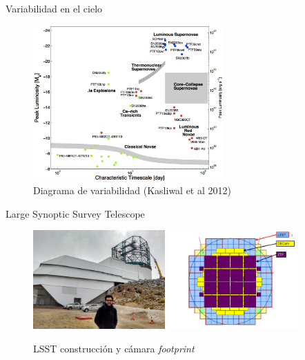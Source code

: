 \documentclass[14pt]{beamer}
\begin{document}
\begin{frame}{Variabilidad en el cielo}
    \begin{figure}
        \centering
        \includegraphics[width=0.65\textwidth]{./images/imgs_seminario1/taumv.png}
        \caption{Diagrama de variabilidad (Kasliwal et al 2012)}
        \label{fig:diag_lleno}
    \end{figure}
\end{frame}

\begin{frame}{Large Synoptic Survey Telescope}
    \begin{figure}
        \includegraphics[width=0.45\textwidth]{./images/yo+LSST.jpg}
        \includegraphics[width=0.45\textwidth]{./images/imgs_seminario1/LSST+DECam+ZTF.jpg}
        \caption{LSST construcci\'on y c\'amara \textit{footprint}}
        \label{fig:camaras}
    \end{figure}
\end{frame}
\end{document}

